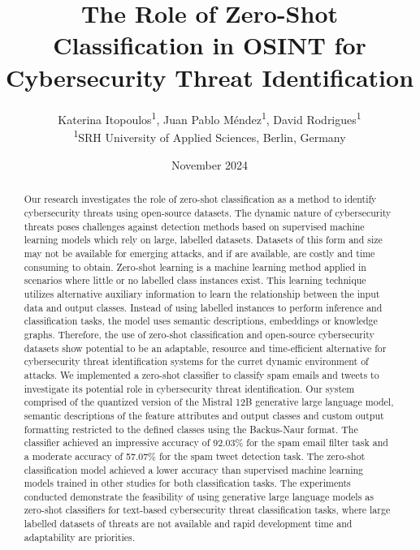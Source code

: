 \documentclass[letterpaper,twocolumn,fleqn]{article}
\title{The Role of Zero-Shot Classification in OSINT for Cybersecurity Threat Identification}
\author{ 
  Katerina Itopoulos\textsuperscript{1}, Juan Pablo Méndez\textsuperscript{1}, David Rodrigues\textsuperscript{1} \\
  \textnormal{\textsuperscript{1}SRH University of Applied Sciences, Berlin, Germany}
}
\date{November 2024} %
\begin{document}
\maketitle 

\thispagestyle{empty} %


\begin{abstract}
  Our research investigates the role of zero-shot classification as a method to identify cybersecurity threats using open-source datasets.
  The dynamic nature of cybersecurity threats poses challenges against detection methods based on supervised machine learning models which rely on large, labelled datasets.
  Datasets of this form and size may not be available for emerging attacks, and if are available, are costly and time consuming to obtain. 
  Zero-shot learning is a machine learning method applied in scenarios where little or no labelled class instances exist. This learning technique utilizes alternative auxiliary information to learn the relationship between the input data and output classes. Instead of using labelled instances to perform inference and classification tasks, the model uses semantic descriptions, embeddings or knowledge graphs.
  Therefore, the use of zero-shot classification and open-source cybersecurity datasets show potential to be an adaptable, resource and time-efficient alternative for cybersecurity threat identification systems for the curret dynamic environment of attacks. 
  We implemented a zero-shot classifier to classify spam emails and tweets to investigate its potential role in cybersecurity threat identification. Our system comprised of the quantized version of the Mistral 12B generative large language model, semantic descriptions of the feature attributes and output classes and custom output formatting restricted to the defined classes using the Backus-Naur format. 
  The classifier achieved an impressive accuracy of 92.03\% for the spam email filter task and a moderate accuracy of 57.07\% for the spam tweet detection task. The zero-shot classification model achieved a lower accuracy than supervised machine learning models trained in other studies for both classification tasks. 
  The experiments conducted demonstrate the feasibility of using generative large language models as zero-shot classifiers for text-based cybersecurity threat classification tasks, where large labelled datasets of threats are not available and rapid development time and adaptability are priorities.
\end{abstract}
\end{document}
